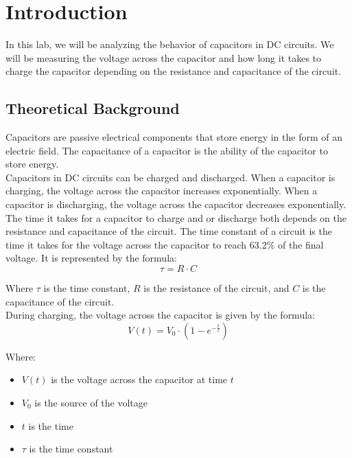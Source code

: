 \documentclass[a4paper, 10pt]{article}
\begin{document}
	\tableofcontents
	\pagebreak
	
	\listoffigures
	\pagebreak
	
	\section{Introduction}
		In this lab, we will be analyzing the behavior of capacitors in DC circuits. 
		We will be measuring the voltage across the capacitor and how long it takes to charge the capacitor depending on the resistance and capacitance of the circuit.

		\subsection{Theoretical Background}
			Capacitors are passive electrical components that store energy in the form of an electric field. 
			The capacitance of a capacitor is the ability of the capacitor to store energy.\\

			Capacitors in DC circuits can be charged and discharged. 
			When a capacitor is charging, the voltage across the capacitor increases exponentially. 
			When a capacitor is discharging, the voltage across the capacitor decreases exponentially.\\

			The time it takes for a capacitor to charge and or discharge both depends on the resistance and capacitance of the circuit.
			The time constant of a circuit is the time it takes for the voltage across the capacitor to reach 63.2\% of the final voltage.
			It is represented by the formula:
			\begin{equation}
				\tau = R \cdot C
				\label{eq:time_constant}
			\end{equation}
			
			Where $\tau$ is the time constant, $R$ is the resistance of the circuit, and $C$ is the capacitance of the circuit.\\

			During charging, the voltage across the capacitor is given by the formula:
			\begin{equation}
				V(t) = V_0 \cdot (1 - e^{-\frac{t}{\tau}})
				\label{eq:charging_voltage}
			\end{equation}

			Where:
			\begin{itemize}
				\item $V(t)$ is the voltage across the capacitor at time $t$
				\item $V_0$ is the source of the voltage
				\item $t$ is the time
				\item $\tau$ is the time constant
			\end{itemize}
\end{document}
